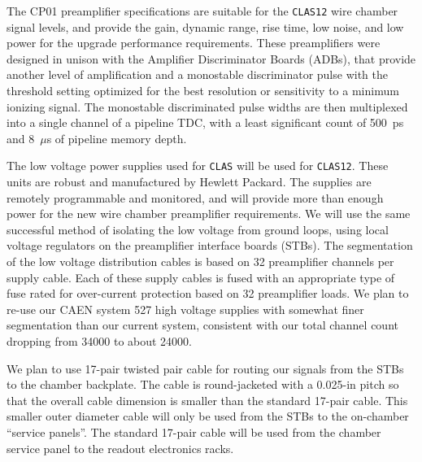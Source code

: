 The CP01 preamplifier specifications are suitable for the {\tt CLAS12} wire 
chamber signal levels, and provide the gain, dynamic range, rise time, low 
noise, and low power for the upgrade performance requirements.  These 
preamplifiers were designed in unison with the Amplifier Discriminator 
Boards (ADBs), that provide another level of amplification and a monostable 
discriminator pulse with the threshold setting optimized for the best 
resolution or sensitivity to a minimum ionizing signal.  The monostable 
discriminated pulse widths are then multiplexed into a single channel of a 
pipeline TDC, with a least significant count of 500~ps and 8~$\mu$s of 
pipeline memory depth.

The low voltage power supplies used for {\tt CLAS} will be used for 
{\tt CLAS12}.  These units are robust and manufactured by Hewlett Packard.  
The supplies are remotely programmable and monitored, and will provide more 
than enough power for the new wire chamber preamplifier requirements.  We 
will use the same successful method of isolating the low voltage from 
ground loops, using local voltage regulators on the preamplifier interface 
boards (STBs).  The segmentation of the low voltage distribution cables is 
based on 32 preamplifier channels per supply cable.  Each of these supply 
cables is fused with an appropriate type of fuse rated for over-current 
protection based on 32 preamplifier loads.  We plan to re-use our CAEN 
system 527 high voltage supplies with somewhat finer segmentation than our 
current system, consistent with our total channel count dropping from 34000 
to about 24000.

We plan to use 17-pair twisted pair cable for routing our signals from the 
STBs to the chamber backplate.  The cable is round-jacketed with a 
0.025-in pitch so that the overall cable dimension is smaller than the 
standard 17-pair cable.  This smaller outer diameter cable will only be 
used from the STBs to the on-chamber ``service panels''.  The standard 
17-pair cable will be used from the chamber service panel to the readout 
electronics racks.

